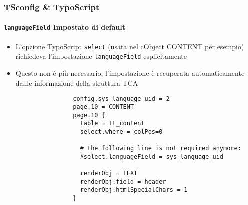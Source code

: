 \begin{frame}[fragile]
	\frametitle{TSconfig \& TypoScript}
	\framesubtitle{\texttt{languageField} Impostato di default}

	\lstset{basicstyle=\tiny\ttfamily}

	\begin{itemize}

		\item L'opzione TypoScript \texttt{select} (usata nel cObject CONTENT per esempio) richiedeva l'impostazione
			\texttt{languageField} esplicitamente

		\item Questo non è più necessario, l'impostazione è recuperata automaticamente dallle informazione della struttura TCA


			\begin{lstlisting}
				config.sys_language_uid = 2
				page.10 = CONTENT
				page.10 {
				  table = tt_content
				  select.where = colPos=0

				  # the following line is not required anymore:
				  #select.languageField = sys_language_uid

				  renderObj = TEXT
				  renderObj.field = header
				  renderObj.htmlSpecialChars = 1
				}
			\end{lstlisting}

	\end{itemize}

\end{frame}

